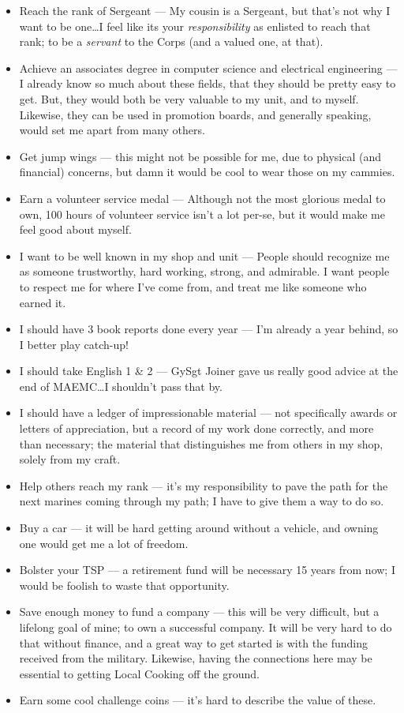 \begin{itemize}
\item Reach the rank of Sergeant --- My cousin is a Sergeant, but that's not why I want
  to be one\ldots I feel like its your \textit{responsibility} as enlisted to reach that rank;
  to be a \textit{servant} to the Corps (and a valued one, at that).
\item Achieve an associates degree in computer science and electrical engineering --- I already
  know so much about these fields, that they should be pretty easy to get. But, they would both
  be very valuable to my unit, and to myself. Likewise, they can be used in promotion boards,
  and generally speaking, would set me apart from many others.
\item Get jump wings --- this might not be possible for me, due to physical (and financial)
  concerns, but damn it would be cool to wear those on my cammies.
\item Earn a volunteer service medal --- Although not the most glorious medal to own, 100
  hours of volunteer service isn't a lot per-se, but it would make me feel good about myself.
\item I want to be well known in my shop and unit --- People should recognize me as someone
  trustworthy, hard working, strong, and admirable. I want people to respect me for where I've
  come from, and treat me like someone who earned it.
\item I should have 3 book reports done every year --- I'm already a year behind, so I better
  play catch-up!
\item I should take English 1 \& 2 --- GySgt Joiner gave us really good advice at the end
  of MAEMC\ldots I shouldn't pass that by.
\item I should have a ledger of impressionable material --- not specifically awards or letters
  of appreciation, but a record of my work done correctly, and more than necessary; the material
  that distinguishes me from others in my shop, solely from my craft.
\item Help others reach my rank --- it's my responsibility to pave the path for the next marines
  coming through my path; I have to give them a way to do so.
\item Buy a car --- it will be hard getting around without a vehicle, and owning one would
  get me a lot of freedom.
\item Bolster your TSP --- a retirement fund will be necessary 15 years from now; I would be
  foolish to waste that opportunity.
\item Save enough money to fund a company --- this will be very difficult, but a lifelong
  goal of mine; to own a successful company. It will be very hard to do that without finance,
  and a great way to get started is with the funding received from the military. Likewise,
  having the connections here may be essential to getting Local Cooking off the ground.
  \item Earn some cool challenge coins --- it's hard to describe the value of these.
\end{itemize}


